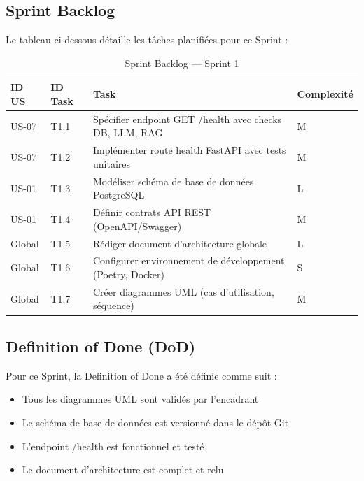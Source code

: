 \subsection{Sprint Backlog}

Le tableau ci-dessous détaille les tâches planifiées pour ce Sprint :

\begin{table}[H]
    \centering
    \caption{Sprint Backlog — Sprint 1}
    \label{tab:sprint1_backlog}
    \small
    \begin{tabular}{p{1cm} p{1cm} p{6cm} p{2cm}}
        \toprule
        \textbf{ID US} & \textbf{ID Task} & \textbf{Task} & \textbf{Complexité} \\
        \midrule
        US-07 & T1.1 & Spécifier endpoint GET /health avec checks DB, LLM, RAG & M \\
        US-07 & T1.2 & Implémenter route health FastAPI avec tests unitaires & M \\
        US-01 & T1.3 & Modéliser schéma de base de données PostgreSQL & L \\
        US-01 & T1.4 & Définir contrats API REST (OpenAPI/Swagger) & M \\
        Global & T1.5 & Rédiger document d'architecture globale & L \\
        Global & T1.6 & Configurer environnement de développement (Poetry, Docker) & S \\
        Global & T1.7 & Créer diagrammes UML (cas d'utilisation, séquence) & M \\
        \bottomrule
    \end{tabular}
\end{table}

\subsection{Definition of Done (DoD)}

Pour ce Sprint, la Definition of Done a été définie comme suit :
\begin{itemize}
    \item Tous les diagrammes UML sont validés par l'encadrant
    \item Le schéma de base de données est versionné dans le dépôt Git
    \item L'endpoint /health est fonctionnel et testé
    \item Le document d'architecture est complet et relu
\end{itemize}


